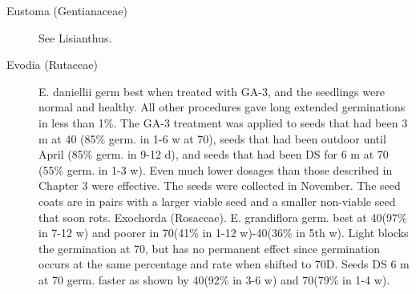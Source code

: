 \begin{description}
\item[Eustoma (Gentianaceae)] See Lisianthus.

\item[Evodia (Rutaceae)] E. daniellii germ best when treated with GA-3, and the
seedlings were normal and healthy. All other procedures gave long extended
germinations in less than 1\%. The GA-3 treatment was applied to seeds that had been
3 m at 40 (85\% germ. in 1-6 w at 70), seeds that had been outdoor until April (85\%
germ. in 9-12 d), and seeds that had been DS for 6 m at 70 (55\% germ. in 1-3 w).
Even much lower dosages than those described in Chapter 3 were effective. The
seeds were collected in November. The seed coats are in pairs with a larger viable
seed and a smaller non-viable seed that soon rots.
Exochorda (Rosaceae). E. grandiflora germ. best at 40(97\% in 7-12 w) and
poorer in 70(41\% in 1-12 w)-40(36\% in 5th w). Light blocks the germination at 70, but
has no permanent effect since germination occurs at the same percentage and rate
when shifted to 70D. Seeds DS 6 m at 70 germ. faster as shown by 40(92\% in 3-6 w)
and 70(79\% in 1-4 w).

\end{description}
